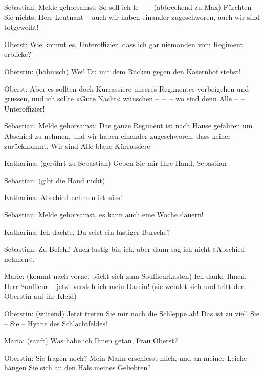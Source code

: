 \pstart
           Sebastian: Melde gehorsamst: So soll ich le – – (abbrechend zu Max) Fürchten Sie
               nichts, Herr Leutnant – auch wir haben einander zugeschworen, auch wir sind
               totgeweiht!\pend
           
\pstart
           Oberst: Wie kommt es, Unteroffizier, dass ich gar niemanden vom Regiment
               erblicke?\pend
           
\pstart
           Oberstin: (höhnisch) Weil Du mit dem Rücken gegen den Kasernhof stehst!\pend
           
\pstart
           Oberst: Aber es sollten doch Kürrassiere unseres Regimentes vorbeigehen und grüssen,
               und ich sollte »Gute Nacht« wünschen – – – wo sind denn Alle – – Unteroffizier!\pend
           
\pstart
           Sebastian: Melde gehorsamst: Das ganze Regiment ist nach Hause gefahren um Abschied
               zu nehmen, und wir haben einander {\pb}zugeschworen, dass keiner zurückkommt. Wir sind Alle blaue Kürrassiere.\pend
           
\pstart
           Katharina: (gerührt zu Sebastian) Geben Sie mir Ihre Hand, Sebastian\pend
           
\pstart
           Sebastian: (gibt die Hand nicht)\pend
           
\pstart
           Katharina: Abschied nehmen ist süss!\pend
           
\pstart
           Sebastian: Melde gehorsamst, es kann auch eine Woche dauern!\pend
           
\pstart
           Katharina: Ich dachte, Du seist ein lustiger Bursche?\pend
           
\pstart
           Sebastian: Zu Befehl! Auch lustig bin ich, aber dann sag ich nicht »Abschied
               nehmen«.\pend
           
\pstart
           Marie: (kommt nach vorne, bückt sich zum Souffleurkasten) Ich danke Ihnen, Herr
               Souffleur – jetzt versteh ich mein Dasein! (sie wendet sich und tritt der Oberstin
               auf ihr Kleid)\pend
           
\pstart
           Oberstin: (wütend) Jetzt treten Sie mir noch die Schleppe ab! \uline{Das} ist zu viel! Sie – Sie – Hyäne des Schlachtfeldes!\pend
           
\pstart
           Maria: (sanft) Was habe ich Ihnen getan, Frau Oberst?\pend
           
\pstart
           Oberstin: Sie fragen noch? Mein Mann erschiesst mich, und an meiner Leiche hängen Sie
               sich an den Hals meines Geliebten?\pend
           
